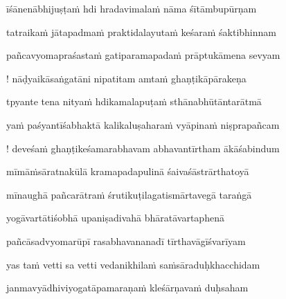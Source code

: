\nemslokab 
īśānenābhijuṣṭa\.m hdi hradavimala\.m nāma śītāmbupūrṇam \danda\dontdisplaylinenum

\nemslokac 
tatraika\.m jātapadma\.m praktidalayuta\.m keśara\.m śaktibhinnam
\dontdisplaylinenum

\nemslokad 
pañcavyomapraśasta\.m gatiparamapada\.m prāptukāmena sevyam \veg\dontdisplaylinenum

\ujvers\nemsloka 
! nāḍyaikāsaṅgatāni nipatitam amta\.m ghaṇṭikāpārakeṇa
\dontdisplaylinenum

\nemslokab 
tpyante tena nitya\.m hdikamalapuṭa\.m sthānabhūtāntarātmā \danda\dontdisplaylinenum

\nemslokac 
ya\.m paśyantīśabhaktā kalikaluṣahara\.m vyāpina\.m niṣprapañcam
\dontdisplaylinenum

\nemslokad 
! deveśa\.m ghaṇṭikeśamarabhavam abhavantīrtham ākāśabindum \veg\dontdisplaylinenum

\ujvers\nemsloka 
mīmā\.msāratnakūlā kramapadapulinā śaivaśāstrārthatoyā
\dontdisplaylinenum

\nemslokab 
mīnaughā pañcarātra\.m śrutikuṭilagatismārtavegā taraṅgā \danda\dontdisplaylinenum

\nemslokac 
yogāvartātiśobhā upaniṣadivahā bhāratāvartaphenā
\dontdisplaylinenum

\nemslokad 
pañcāsadvyomarūpī rasabhavananadī tīrthavāgīśvarīyam \veg\dontdisplaylinenum

\ujvers\nemsloka 
yas ta\.m vetti sa vetti vedanikhila\.m sa\.msāraduḥkhacchidam
\dontdisplaylinenum

\nemslokab 
janmavyādhiviyogatāpamaraṇa\.m kleśārṇava\.m duḥsaham \danda\dontdisplaylinenum

